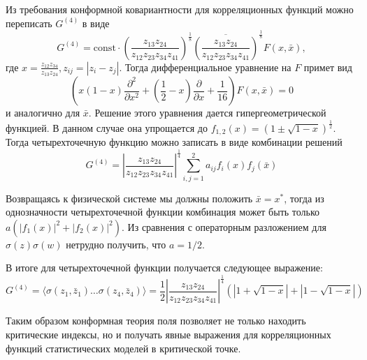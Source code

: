 \documentclass[a4paper,12pt]{article}
\theoremstyle{definition}
\begin{document}
Из требования конформной ковариантности для корреляционных функций можно переписать $G^{(4)}$ в виде
  $$G^{(4)} = \mathrm{const}\cdot \left(\frac{z_{13}z_{24}}{z_{12} z_{23}z_{34}z_{41}}\right)^{\frac{1}{8}} \overline{ \left(\frac{z_{13}z_{24}}{z_{12} z_{23}z_{34}z_{41}}\right)}^{\frac{1}{8}}F(x,\bar x),$$
где $x=\frac{z_{12}z_{34}}{z_{13}z_{24}}, z_{ij}=\left| z_{i}-z_{j}\right|$. Тогда дифференциальное уравнение на $F$ примет вид
 $$ \left( x(1-x) \frac{\partial^{2}}{\partial x^{2}} +(\frac{1}{2}-x)\frac{\partial}{\partial x}+\frac{1}{16}\right) F(x,\bar x)=0$$
и аналогично для $\bar x$.
Решение этого уравнения дается гипергеометрической функцией. В данном случае она упрощается до $f_{1,2}(x)=(1\pm \sqrt{1-x})^{\frac{1}{2}}$. Тогда  четырехточечную функцию можно записать в виде комбинации решений
$$  G^{(4)} =  \left|\frac{z_{13}z_{24}}{z_{12} z_{23}z_{34}z_{41}}\right|^{\frac{1}{4}}\sum_{i,j=1}^{2}a_{ij}f_{i}(x)f_{j}(\bar x)$$

Возвращаясь к физической системе мы должны положить $\bar x= x^{*}$, тогда из однозначности четырехточечной функции комбинация может быть только $a(|f_{1}(x)|^{2}+|f_{2}(x)|^{2})$. Из сравнения с операторным разложением для $\sigma(z)\sigma(w)$ нетрудно получить, что $a=1/2$.

В итоге для четырехточечной функции получается следующее выражение:
  $$G^{(4)} =\langle \sigma(z_1,\bar z_1)\dots \sigma(z_4,\bar z_4)\rangle = \frac{1}{2} \left|\frac{z_{13}z_{24}}{z_{12} z_{23}z_{34}z_{41}}\right|^{\frac{1}{4}}\left(\left|1+\sqrt{1-x}\right| + \left|1-\sqrt{1-x}\right|\right)$$

Таким образом конформная теория поля позволяет не только находить
критические индексы, но и получать явные выражения  для корреляционных
функций статистических моделей в критической  точке. 
\end{document}
